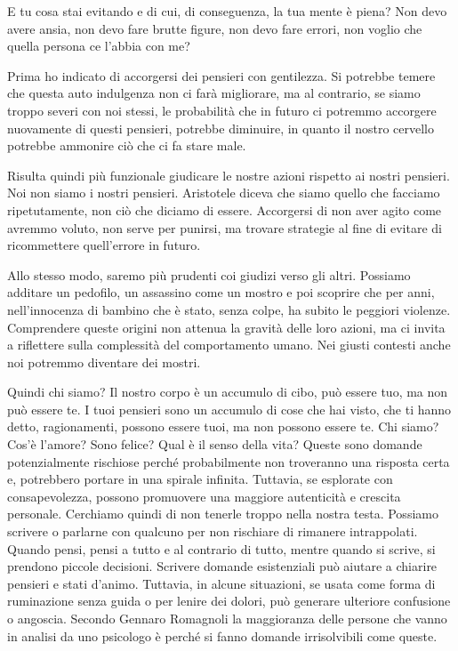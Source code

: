 \documentclass[12pt]{book} %
\begin{document}
E tu cosa stai evitando e di cui, di conseguenza, la tua mente è piena? Non devo avere ansia, non devo fare brutte figure, non devo fare errori, non voglio che quella persona ce l'abbia con me?

Prima ho indicato di accorgersi dei pensieri con gentilezza. Si potrebbe temere che questa auto indulgenza non ci farà migliorare, ma al contrario, se siamo troppo severi con noi stessi, le probabilità che in futuro ci potremmo accorgere nuovamente di questi pensieri, potrebbe diminuire, in quanto il nostro cervello potrebbe ammonire ciò che ci fa stare male. 

Risulta quindi più funzionale giudicare le nostre azioni rispetto ai nostri pensieri. Noi non siamo i nostri pensieri. Aristotele diceva che siamo quello che facciamo ripetutamente, non ciò che diciamo di essere. Accorgersi di non aver agito come avremmo voluto, non serve per punirsi, ma trovare strategie al fine di evitare di ricommettere quell'errore in futuro.

Allo stesso modo, saremo più prudenti coi giudizi verso gli altri. Possiamo additare un pedofilo, un assassino come un mostro e poi scoprire che per anni, nell'innocenza di bambino che è stato, senza colpe, ha subito le peggiori violenze. Comprendere queste origini non attenua la gravità delle loro azioni, ma ci invita a riflettere sulla complessità del comportamento umano. Nei giusti contesti anche noi potremmo diventare dei mostri.

Quindi chi siamo? Il nostro corpo è un accumulo di cibo, può essere tuo, ma non può essere te. I tuoi pensieri sono un accumulo di cose che hai visto, che ti hanno detto, ragionamenti, possono essere tuoi, ma non possono essere te. Chi siamo? Cos'è l'amore? Sono felice? Qual è il senso della vita? 
Queste sono domande potenzialmente rischiose perché probabilmente non troveranno una risposta certa e, potrebbero portare in una spirale infinita. Tuttavia, se esplorate con consapevolezza, possono promuovere una maggiore autenticità e crescita personale. Cerchiamo quindi di non tenerle troppo nella nostra testa. Possiamo scrivere o parlarne con qualcuno per non rischiare di rimanere intrappolati. Quando pensi, pensi a tutto e al contrario di tutto, mentre quando si scrive, si prendono piccole decisioni. Scrivere domande esistenziali può aiutare a chiarire pensieri e stati d’animo. Tuttavia, in alcune situazioni, se usata come forma di ruminazione senza guida o per lenire dei dolori, può generare ulteriore confusione o angoscia. 
Secondo Gennaro Romagnoli la maggioranza delle persone che vanno in analisi da uno psicologo è perché si fanno domande irrisolvibili come queste.
\end{document}
